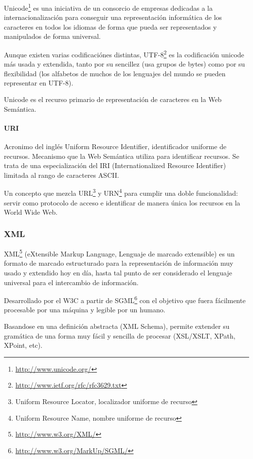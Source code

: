 Unicode\footnote{\url{http://www.unicode.org/}} es una iniciativa de un consorcio de 
empresas dedicadas a la internacionalización para conseguir una representación 
informática de los caracteres en todos los idiomas de forma que pueda ser representados
y manipulados de forma universal. 

Aunque existen varias codificaciónes distintas, 
UTF-8\footnote{\url{http://www.ietf.org/rfc/rfc3629.txt}} es la codificación 
unicode más usada y extendida, tanto por su sencillez (usa grupos de bytes) 
como por su flexibilidad (los alfabetos de muchos de los lenguajes del mundo 
se pueden representar en UTF-8).

Unicode es el recurso primario de representación de caracteres en la Web Semántica.

\paragraph{URI}

Acronimo del inglés Uniform Resource Identifier, identificador uniforme de recursos.
Mecanismo que la Web Semántica utiliza para identificar recursos. Se trata de una
especialización del IRI (Internationalized Resource Identifier) limitada al rango
de caracteres ASCII.

Un concepto que mezcla URL\footnote{Uniform Resource Locator, localizador uniforme de recurso} 
y URN\footnote{Uniform Resource Name, nombre uniforme de recurso} para cumplir una doble 
funcionalidad: servir como protocolo de acceso e identificar de manera única los recursos 
en la World Wide Web.

\subsubsection{XML}

XML\footnote{\url{http://www.w3.org/XML/}} (eXtensible Markup Language, Lenguaje 
de marcado extensible) es un formato de marcado estructurado para la representación 
de información muy usado y extendido hoy en día, hasta tal punto de ser considerado 
el lenguaje universal para el intercambio de información. 

Desarrollado por el W3C a partir de SGML\footnote{\url{http://www.w3.org/MarkUp/SGML/}} 
con el objetivo que fuera fácilmente procesable por una máquina y legible por un 
humano. 

Basandose en una definición abstracta (XML Schema), permite extender su gramática 
de una forma muy fácil y sencilla de procesar (XSL/XSLT, XPath, XPoint, etc).

